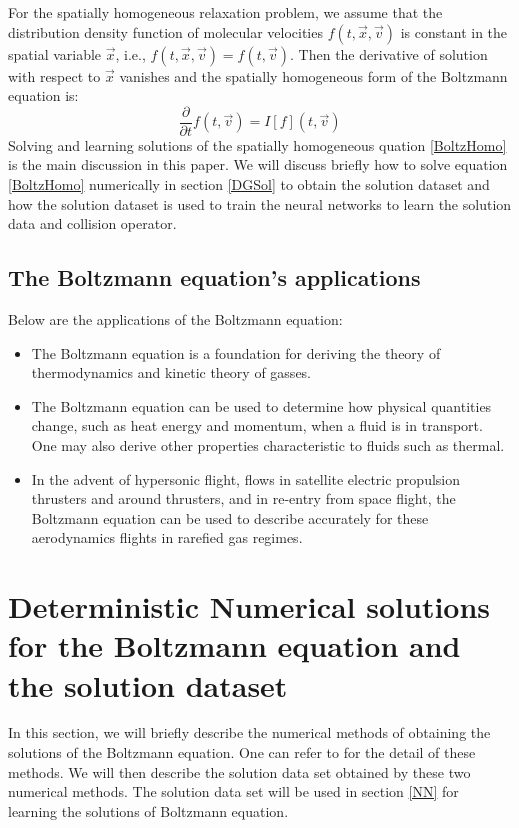 \documentclass{article}
\begin{document}
For the spatially homogeneous relaxation problem, we assume that the distribution density function of molecular velocities $f(t, \vec{x}, \vec{v})$ is constant in the spatial variable $\vec{x}$, i.e., $f(t, \vec{x}, \vec{v}) = f(t, \vec{v})$. Then the derivative of solution with respect to $\vec{x}$ vanishes and the spatially homogeneous form of the Boltzmann equation is:
\begin{equation}	\label{BoltzHomo}
	\frac{\partial}{\partial t}f(t,\vec{v}) = I[f](t, \vec{v})
\end{equation}
Solving and learning solutions of the spatially homogeneous quation \ref{BoltzHomo} is the main discussion in this paper. We will discuss briefly how to solve equation \ref{BoltzHomo} numerically in section \ref{DGSol} to obtain the solution dataset and how the solution dataset is used to train the neural networks to learn the solution data and collision operator.
\subsection{The Boltzmann equation's applications}
Below are the applications of the Boltzmann equation:
\begin{itemize}
	\item The Boltzmann equation is a foundation for deriving the theory of thermodynamics and kinetic theory of gasses.
	\item The Boltzmann equation can be used to determine how physical quantities change, such as heat energy and momentum, when a fluid is in transport. One may also derive other properties characteristic to fluids such as thermal.
	\item In the advent of hypersonic flight, flows in satellite electric propulsion thrusters and around thrusters, and in re-entry from space flight, the Boltzmann equation can be used to describe accurately for these aerodynamics flights in rarefied gas regimes.
\end{itemize}

\section{Deterministic Numerical solutions for the Boltzmann equation and the solution dataset} \label{BoltzSol}
In this section, we will briefly describe the numerical methods of obtaining the solutions of the Boltzmann equation. One can refer to \cite{Alekseenko2, Alekseenko4} for the detail of these methods. We will then describe the solution data set obtained by these two numerical methods. The solution data set will be used in section \ref{NN} for learning the solutions of Boltzmann equation.
\end{document}
